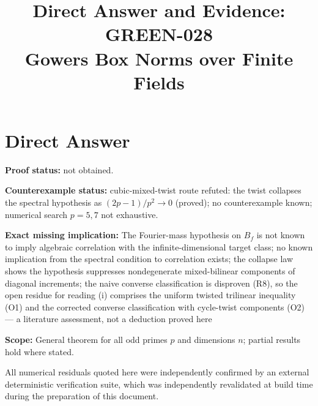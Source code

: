 \documentclass[11pt]{article}
\title{Direct Answer and Evidence: GREEN-028\\
\large Gowers Box Norms over Finite Fields}
\author{}
\date{}
\begin{document}
\maketitle

\section*{Direct Answer}
\noindent{}\medskip

\noindent\textbf{Proof status:} not obtained.

\noindent\textbf{Counterexample status:} cubic-mixed-twist route refuted: the twist collapses the spectral hypothesis as $(2p-1)/p^2\to0$ (proved); no counterexample known; numerical search $p=5,7$ not exhaustive.

\noindent\textbf{Exact missing implication:} The Fourier-mass hypothesis on $B_f$ is not known to imply algebraic correlation with the infinite-dimensional target class; no known implication from the spectral condition to correlation exists; the collapse law shows the hypothesis suppresses nondegenerate mixed-bilinear components of diagonal increments; the naive converse classification is disproven (R8), so the open residue for reading (i) comprises the uniform twisted trilinear inequality (O1) and the corrected converse classification with cycle-twist components (O2) — a literature assessment, not a deduction proved here

\noindent\textbf{Scope:} General theorem for all odd primes $p$ and dimensions $n$; partial results hold where stated.

All numerical residuals quoted here were independently confirmed by an
external deterministic verification suite, which was independently revalidated at build time during the
preparation of this document.
\end{document}
